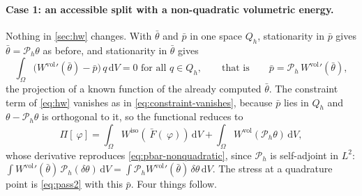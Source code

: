 \documentclass{article}
\newcommand{\F}{~F}
\newcommand{\disp}{~\varphi}
\newcommand{\diff}{\,\mathrm{d}}
\newcommand{\supvol}{^{\mathrm{vol}}}
\newcommand{\supiso}{^{\mathrm{iso}}}
\theoremstyle{definition}
\theoremstyle{plain}
\begin{document}
\paragraph{Case 1: an accessible split with a non-quadratic volumetric
energy.} Nothing in \cref{sec:hw} changes. With $\bar\theta$ and $\bar p$
in one space $Q_h$, stationarity in $\bar p$ gives $\bar\theta =
\mathcal{P}_h\theta$ as before, and stationarity in $\bar\theta$ gives
\begin{equation}
  \label{eq:pbar-nonquadratic}
  \int_\Omega \big( W\supvol{}'(\bar\theta) - \bar p \big)\, q \diff V = 0
  \text{ for all } q \in Q_h,
  \qquad\text{that is}\qquad
  \bar p = \mathcal{P}_h\, W\supvol{}'(\bar\theta) ,
\end{equation}
the projection of a known function of the already computed $\bar\theta$.
The constraint term of \eqref{eq:hw} vanishes as in
\eqref{eq:constraint-vanishes}, because $\bar p$ lies in $Q_h$ and
$\theta - \mathcal{P}_h\theta$ is orthogonal to it, so the functional
reduces to
\begin{equation}
  \label{eq:collapsed-general}
  \Pi[\disp] = \int_\Omega W\supiso\!\left(\bar{\F}(\disp)\right) \diff V
             + \int_\Omega W\supvol\!\left(\mathcal{P}_h \theta\right) \diff V ,
\end{equation}
whose derivative reproduces \eqref{eq:pbar-nonquadratic}, since
$\mathcal{P}_h$ is self-adjoint in $L^2$: $\int W\supvol{}'(\bar\theta)\,
\mathcal{P}_h(\delta\theta) \diff V = \int \mathcal{P}_h W\supvol{}'(\bar\theta)\,
\delta\theta \diff V$. The stress at a quadrature point is
\eqref{eq:pass2} with this $\bar p$. Four things follow.
\end{document}
